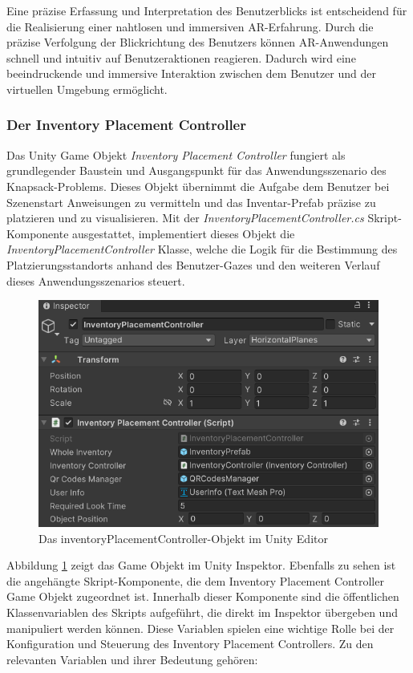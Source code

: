 \begin{itemize}
Eine präzise Erfassung und Interpretation des Benutzerblicks ist entscheidend für die Realisierung einer nahtlosen und
immersiven AR-Erfahrung. Durch die präzise Verfolgung der Blickrichtung des Benutzers können AR-Anwendungen schnell und
intuitiv auf Benutzeraktionen reagieren. Dadurch wird eine beeindruckende und immersive Interaktion zwischen dem Benutzer
und der virtuellen Umgebung ermöglicht.

\subsubsection{Der Inventory Placement Controller}
Das Unity Game Objekt \textit{Inventory Placement Controller} fungiert als grundlegender Baustein und Ausgangspunkt für
das Anwendungsszenario des Knapsack-Problems. Dieses Objekt übernimmt die Aufgabe dem Benutzer bei Szenenstart Anweisungen
zu vermitteln und das Inventar-Prefab präzise zu platzieren und zu visualisieren. Mit der \textit{InventoryPlacementController.cs}
Skript-Komponente ausgestattet, implementiert dieses Objekt die \textit{InventoryPlacementController} Klasse, welche die
Logik für die Bestimmung des Platzierungsstandorts anhand des Benutzer-Gazes und den weiteren Verlauf dieses Anwendungsszenarios
steuert.

\begin{figure}[H]
    \centering
    \includegraphics[scale=0.8]{images/invPlace_Editor}
    \caption{Das inventoryPlacementController-Objekt im Unity Editor}
    \label{fig:inventoryPlacementController_Editor}
\end{figure}

Abbildung \ref{fig:inventoryPlacementController_Editor} zeigt das Game Objekt im Unity Inspektor. Ebenfalls zu sehen ist
die angehängte Skript-Komponente, die dem Inventory Placement Controller Game Objekt zugeordnet ist. Innerhalb dieser
Komponente sind die öffentlichen Klassenvariablen des Skripts aufgeführt, die direkt im Inspektor übergeben und manipuliert
werden können. Diese Variablen spielen eine wichtige Rolle bei der Konfiguration und Steuerung des Inventory Placement
Controllers. Zu den relevanten Variablen und ihrer Bedeutung gehören:


\end{itemize}
